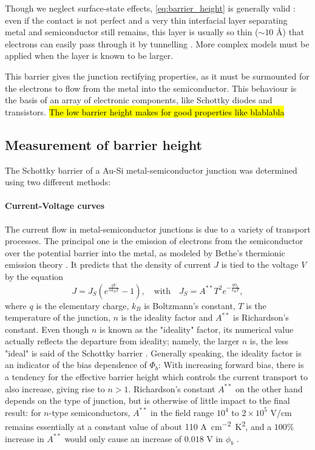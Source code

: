 Though we neglect surface-state effects, \autoref{eq:barrier_height} is generally valid \cite{sze_physics_2007}:
even if the contact is not perfect and a very thin interfacial layer separating metal and semiconductor still remains, this layer is usually so thin ($\sim 10$ \AA) that electrons can easily pass through it by tunnelling \cite{rhoderick_physics_1970}.
More complex models must be applied when the layer is known to be larger.

This barrier gives the junction rectifying properties, as it must be surmounted for the electrons to flow from the metal into the semiconductor.
This behaviour is the basis of an array of electronic components, like Schottky diodes and transistors.
\hl{The low barrier height makes for good properties like blablabla}

\subsection{Measurement of barrier height}
The Schottky barrier of a Au-Si metal-semiconductor junction was determined using two different methods:

\paragraph{Current-Voltage curves}
The current flow in metal-semiconductor junctions is due to a variety of transport processes.
The principal one is the emission of electrons from the semiconductor over the potential barrier into the metal, as modeled by Bethe's thermionic emission theory \cite{sze_physics_2007}.
It predicts that the density of current $J$ is tied to the voltage $V$ by the equation
\begin{equation} \label{eq:thermionic_emission_current}
    J = J_S \left( e^{\frac{qV}{n k_B T}} - 1 \right), \quad \text{{with}} \quad J_S = A^{**} T^2 e^{-\frac{q \phi_b}{k_B T}},
\end{equation}
where $q$ is the elementary charge, $k_B$ is Boltzmann's constant, $T$ is the temperature of the junction, $n$ is the ideality factor and $A^{**}$ is Richardson's constant.
Even though $n$ is known as the  "ideality" factor, its numerical value actually reflects the departure from ideality; namely, the larger $n$ is, the less "ideal" is said of the Schottky barrier \cite{tung_recent_2001}.
Generally speaking, the ideality factor is an indicator of the bias dependence of $\Phi_b$:  With increasing forward bias, there is a tendency for the effective barrier height which controls the current transport to also increase, giving rise to $n > 1$.
Richardson's constant $A^{**}$ on the other hand depends on the type of junction, but is otherwise of little impact to the final result:
for $n$-type semiconductors, $A^{**}$ in the field range $10^4$ to $2\times 10^5$ V/cm remains essentially at a constant value of about 110 \unit{A cm^{-2} K^2}, and a $100 \%$ increase in $A^{**}$ would only cause an increase of $0.018$ V in $\phi_b$ \cite{sze_physics_2007}.

